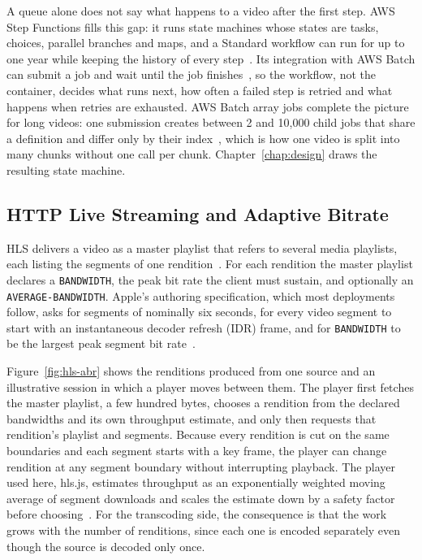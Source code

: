 A queue alone does not say what happens to a video after the first step. AWS Step Functions fills
this gap: it runs state machines whose states are tasks, choices, parallel branches and maps, and a
Standard workflow can run for up to one year while keeping the history of every
step~\cite{awsstepfunctions}. Its integration with AWS Batch can submit a job and wait until the job
finishes~\cite{awssfnbatch}, so the workflow, not the container, decides what runs next, how often a
failed step is retried and what happens when retries are exhausted. AWS Batch array jobs complete the
picture for long videos: one submission creates between 2 and 10,000 child jobs that share a
definition and differ only by their index~\cite{awsbatcharray}, which is how one video is split into
many chunks without one call per chunk. Chapter~\ref{chap:design} draws the resulting state machine.

\subsection{HTTP Live Streaming and Adaptive Bitrate}
\label{sec:hls-abr}

HLS delivers a video as a master playlist that refers to several media playlists, each listing the
segments of one rendition~\cite{rfc8216}. For each rendition the master playlist declares a
\texttt{BANDWIDTH}, the peak bit rate the client must sustain, and optionally an
\texttt{AVERAGE-BANDWIDTH}. Apple's authoring specification, which most deployments follow, asks for
segments of nominally six seconds, for every video segment to start with an instantaneous decoder refresh (IDR) frame, and for
\texttt{BANDWIDTH} to be the largest peak segment bit rate~\cite{applehlsauthoring}.

Figure~\ref{fig:hls-abr} shows the renditions produced from one source and an illustrative session
in which a player moves between them. The player first fetches the master playlist, a few hundred bytes, chooses a
rendition from the declared bandwidths and its own throughput estimate, and only then requests that
rendition's playlist and segments. Because every rendition is cut on the same boundaries and each
segment starts with a key frame, the player can change rendition at any segment boundary without
interrupting playback. The player used here, hls.js, estimates throughput as an exponentially
weighted moving average of segment downloads and scales the estimate down by a safety factor
before choosing~\cite{hlsjs}. For the transcoding side, the consequence is that the work grows with
the number of renditions, since each one is encoded separately even though the source is decoded
only once.

